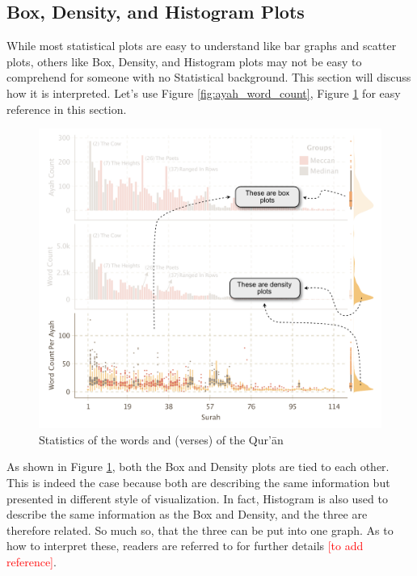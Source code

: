 \subsection{Box, Density, and Histogram Plots}
While most statistical plots are easy to understand like bar graphs and scatter plots, others like Box, Density, and Histogram plots may not be easy to comprehend for someone with no Statistical background. This section will discuss how it is interpreted. Let's use Figure \ref{fig:ayah_word_count}, Figure \ref{fig:ayah_word_count_with_desc} for easy reference in this section.
\begin{figure}[!b]
    \centering
    \includegraphics[width=\textwidth]{img/plot1-desc.pdf}
    \caption{Statistics of the words and   (verses) of the Qur'\=an}
    \label{fig:ayah_word_count_with_desc}
\end{figure}

As shown in Figure \ref{fig:ayah_word_count_with_desc}, both the Box and Density plots are tied to each other. This is indeed the case because both are describing the same information but presented in different style of visualization. In fact, Histogram is also used to describe the same information as the Box and Density, and the three are therefore related. So much so, that the three can be put into one graph. As to how to interpret these, readers are referred to for further details \textcolor{red}{[to add reference]}.